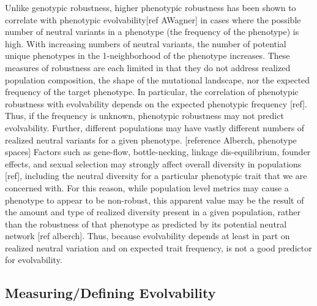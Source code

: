 Unlike genotypic robustness, higher phenotypic robustness has been shown to correlate with phenotypic evolvability[ref AWagner] in cases where the possible number of neutral variants in a phenotype (the frequency of the phenotype) is high. With increasing numbers of neutral variants, the number of potential unique phenotypes in the 1-neighborhood of the phenotype increases.
These measures of robustness are each limited in that they do not address realized population composition, the shape of the mutational landscape, nor the expected frequency of the target phenotype. In particular, the correlation of phenotypic robustness with evolvability depends on the expected phenotypic frequency [ref]. Thus, if the frequency is unknown, phenotypic robustness may not predict evolvability.
Further, different populations may have vastly different numbers of realized neutral variants for a given phenotype. [reference Alberch, phenotype spaces] Factors such as gene-flow, bottle-necking, linkage dis-equilibrium, founder effects, and sexual selection may strongly affect overall diversity in populations [ref], including the neutral diversity for a particular phenotypic trait that we are concerned with.
For this reason, while population level metrics may cause a phenotype to appear to be non-robust, this apparent value may be the result of the amount and type of realized diversity present in a given population, rather than the robustness of that phenotype as predicted by its potential neutral network [ref alberch]. Thus, because evolvability depends at least in part on realized neutral variation and on expected trait frequency,  is not a good predictor for evolvability.

\subsection{Measuring/Defining Evolvability}

